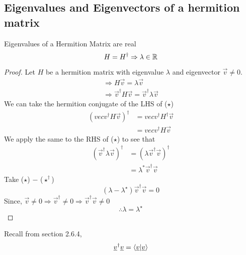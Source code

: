 \documentclass{article}
\numberwithin{equation}{section}
\begin{document}
\subsection{Eigenvalues and Eigenvectors of a hermition matrix}
\begin{thm}
    Eigenvalues of a Hermition Matrix are real
    \begin{equation}\label{eq:5-21}
        H = H^\dagger \Rightarrow \lambda \in \mathbb{R}
    \end{equation}
    \begin{proof} Let $H$ be a hermition matrix with eigenvalue $\lambda$ and eigenvector $\vec v \neq 0$.
        \begin{align*}
            \Rightarrow H\vec v = \lambda \vec v \\
            \Rightarrow \vec v^\dagger H\vec v = \vec v^\dagger \lambda \vec v \tag{($\star$)}
        \end{align*}
        We can take the hermition conjugate of the LHS of ($\star$)
        \begin{align*}
            (vec v^\dagger H\vec v)^\dagger &= vec v^\dagger H^\dagger \vec v \\
            &= vec v^\dagger H\vec v
        \end{align*}
        We apply the same to the RHS of ($\star$) to see that
        \begin{align*}
            (\vec v^\dagger \lambda \vec v)^\dagger &= (\lambda \vec v^\dagger \vec v)^\dagger \\
            &= \lambda^* \vec v^\dagger \vec v \tag{($\star^\dagger$)}
        \end{align*}
        Take ($\star$) $-$ ($\star^\dagger$)
        \[
            (\lambda - \lambda^\star)\vec v^\dagger \vec v = 0
        \]
        Since, $\vec v \neq 0 \Rightarrow \vec v^\dagger \neq 0 \Rightarrow \vec v^\dagger \vec v \neq 0$
        \[
            \therefore \lambda = \lambda^\star
        \]
    \end{proof}
\end{thm}

Recall from section 2.6.4,
\[
    \underline{v}^\dagger \underline{v} = \left\langle \underline{v}\middle\vert \underline{v} \right\rangle
\]
\end{document}
